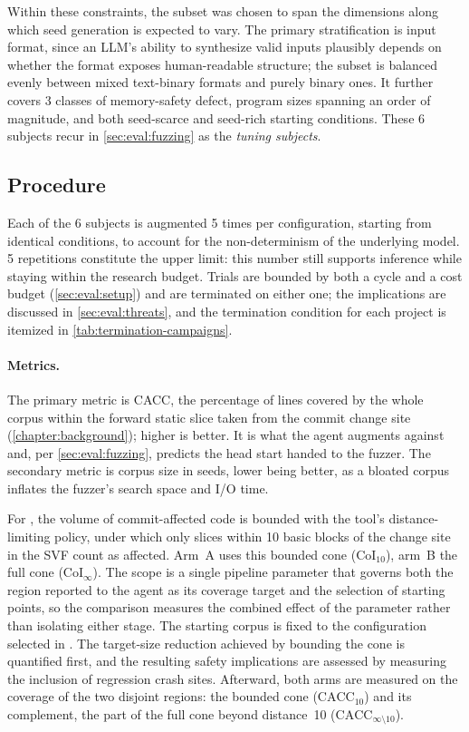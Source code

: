 Within these constraints, the subset was chosen to span the dimensions along which seed generation is expected to vary.
The primary stratification is input format, since an \ac{LLM}'s ability to synthesize valid inputs plausibly depends on whether the format exposes human-readable structure; the subset is balanced evenly between mixed text-binary formats and purely binary ones.
It further covers \num{3} classes of memory-safety defect, program sizes spanning an order of magnitude, and both seed-scarce and seed-rich starting conditions.
These \num{6} subjects recur in \autoref{sec:eval:fuzzing} as the \emph{tuning subjects}.

\subsection{Procedure}\label{sec:eval:seedgen:procedure}
Each of the \num{6} subjects is augmented \num{5} times per configuration, starting from identical conditions, to account for the non-determinism of the underlying model.
\num{5} repetitions constitute the upper limit: this number still supports inference while staying within the research budget.
Trials are bounded by both a cycle and a cost budget (\cref{sec:eval:setup}) and are terminated on either one; the implications are discussed in \cref{sec:eval:threats}, and the termination condition for each project is itemized in \cref{tab:termination-campaigns}.

\paragraph{Metrics.}
The primary metric is \acf{CACC}, the percentage of lines covered by the whole corpus within the forward static slice taken from the commit change site (\cref{chapter:background}); higher is better.
It is what the agent augments against and, per \cref{sec:eval:fuzzing}, predicts the head start handed to the fuzzer.
The secondary metric is corpus size in seeds, lower being better, as a bloated corpus inflates the fuzzer's search space and I/O time.

For , the volume of commit-affected code is bounded with the tool's distance-limiting policy, under which only slices within \num{10} basic blocks of the change site in the \ac{SVF} count as affected.
Arm~A uses this bounded cone ($\mathrm{CoI}_{10}$), arm~B the full cone ($\mathrm{CoI}_{\infty}$).
The scope is a single pipeline parameter that governs both the region reported to the agent as its coverage target and the selection of starting points, so the comparison measures the combined effect of the parameter rather than isolating either stage.
The starting corpus is fixed to the configuration selected in .
The target-size reduction achieved by bounding the cone is quantified first, and the resulting safety implications are assessed by measuring the inclusion of regression crash sites.
Afterward, both arms are measured on the coverage of the two disjoint regions: the bounded cone ($\mathrm{CACC}_{10}$) and its complement, the part of the full cone beyond distance~\num{10} ($\mathrm{CACC}_{\infty \setminus 10}$).

